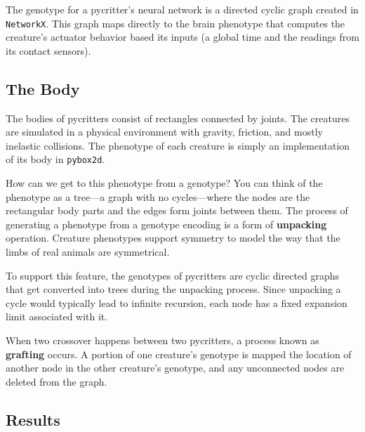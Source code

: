 \documentclass[10pt]{book}
\begin{document}
The genotype for a pycritter's neural network is a directed cyclic graph created in {\tt NetworkX}. This graph maps directly to the brain phenotype that computes the creature's actuator behavior based its inputs (a global time and the readings from its contact sensors).

\subsection{The Body}


The bodies of pycritters consist of rectangles connected by joints. The creatures are simulated in a physical environment with gravity, friction, and mostly inelastic collisions. The phenotype of each creature is simply an implementation of its body in {\tt pybox2d}.

How can we get to this phenotype from a genotype? You can think of the phenotype as a tree---a graph with no cycles---where the nodes are the rectangular body parts and the edges form joints between them. The process of generating a phenotype from a genotype encoding is a form of {\bf unpacking} operation. Creature phenotypes support symmetry to model the way that the limbs of real animals are symmetrical. 

To support this feature, the genotypes of pycritters are cyclic directed graphs that get converted into trees during the unpacking process. Since unpacking a cycle would typically lead to infinite recursion, each node has a fixed expansion limit associated with it.

When two crossover happens between two pycritters, a process known as {\bf grafting} occurs. A portion of one creature's genotype is mapped the location of another node in the other creature's genotype, and any unconnected nodes are deleted from the graph.


\subsection{Results}

\end{document}
